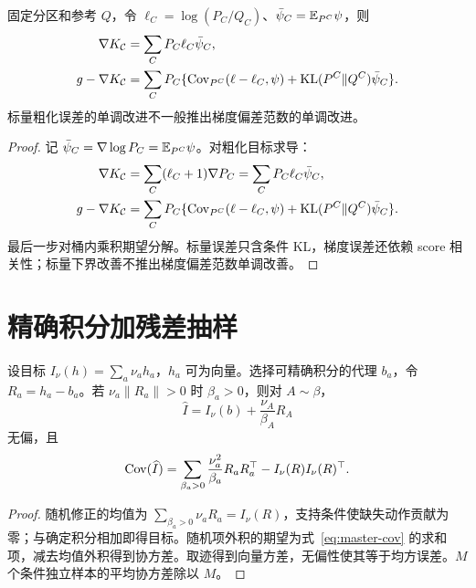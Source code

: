 \begin{proposition}
固定分区和参考 $Q$，令 $\ell_C=\log(P_C/Q_C)$、$\bar\psi_C=\mathbb E_{P^C}\psi$，则
\begin{align}
\nabla K_{\mathcal C}&=\sum_CP_C\ell_C\bar\psi_C,\\
g-\nabla K_{\mathcal C}
&=\sum_CP_C\{\operatorname{Cov}_{P^C}(\ell-\ell_C,\psi)+\operatorname{KL}(P^C\Vert Q^C)\bar\psi_C\}.
\end{align}
标量粗化误差的单调改进不一般推出梯度偏差范数的单调改进。
\end{proposition}
\begin{proof}
记 $\bar\psi_C=\nabla\log P_C=\mathbb E_{P^C}\psi$。对粗化目标求导：
\begin{align}
\nabla K_{\mathcal C}
&=\sum_C(\ell_C+1)\nabla P_C
=\sum_CP_C\ell_C\bar\psi_C,\\
g-\nabla K_{\mathcal C}
&=\sum_CP_C\{\operatorname{Cov}_{P^C}(\ell-\ell_C,\psi)
+\operatorname{KL}(P^C\Vert Q^C)\bar\psi_C\}.
\end{align}
最后一步对桶内乘积期望分解。标量误差只含条件 KL，梯度误差还依赖 score 相关性；标量下界改善不推出梯度偏差范数单调改善。
\end{proof}

\section{精确积分加残差抽样}
\begin{theorem}[统一估计与协方差]
设目标 $I_\nu(h)=\sum_a\nu_ah_a$，$h_a$ 可为向量。选择可精确积分的代理 $b_a$，令 $R_a=h_a-b_a$。若 $\nu_a\|R_a\|>0$ 时 $\beta_a>0$，则对 $A\sim\beta$，
\begin{equation}
\widehat I=I_\nu(b)+\frac{\nu_A}{\beta_A}R_A
\end{equation}
无偏，且
\begin{equation}
\operatorname{Cov}(\widehat I)=\sum_{\beta_a>0}\frac{\nu_a^2}{\beta_a}R_aR_a^\top
-I_\nu(R)I_\nu(R)^\top.
\label{eq:master-cov}
\end{equation}
\end{theorem}
\begin{proof}
随机修正的均值为 $\sum_{\beta_a>0}\nu_aR_a=I_\nu(R)$，支持条件使缺失动作贡献为零；与确定积分相加即得目标。随机项外积的期望为式~\eqref{eq:master-cov} 的求和项，减去均值外积得到协方差。取迹得到向量方差，无偏性使其等于均方误差。$M$ 个条件独立样本的平均协方差除以 $M$。
\end{proof}

